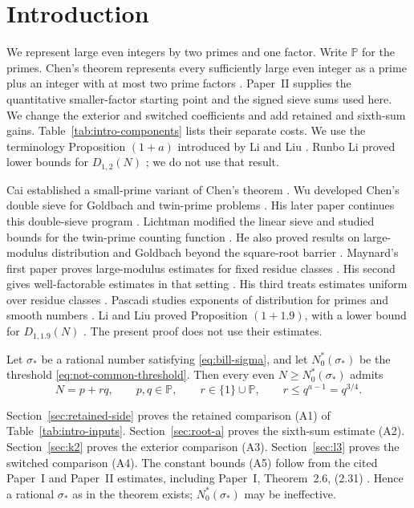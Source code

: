 \section{Introduction}\label{sec:introduction}

We represent large even integers by two primes and one factor.
Write $\mathbb P$ for the primes.
Chen's theorem represents every sufficiently large even integer as a prime
plus an integer with at most two prime factors
\cite{Chen2002}. Paper~II supplies the quantitative smaller-factor starting
point and the signed sieve sums used here. We change the exterior and
switched coefficients and add retained and sixth-sum gains.
Table~\ref{tab:intro-components} lists their separate costs.
We use the terminology Proposition $(1+a)$ introduced by Li and Liu
\cite[p.~2, (1.6)]{LiLiu2026}.
Runbo Li proved lower bounds for $D_{1,2}(N)$
\cite{RunboLi2024}; we do not use that result.

Cai established a small-prime variant of Chen's theorem \cite{Cai2002}.
Wu developed Chen's double sieve for Goldbach and twin-prime problems
\cite{Wu2004}. His later paper continues this double-sieve program
\cite{Wu2008}. Lichtman modified the linear sieve and studied bounds for the
twin-prime counting function \cite{Lichtman21}. He also proved results on
large-modulus distribution and Goldbach beyond the square-root barrier
\cite{Lichtman23}. Maynard's first paper proves large-modulus estimates for
fixed residue classes \cite{MaynardI}. His second gives well-factorable
estimates in that setting \cite{MaynardII}. His third treats estimates
uniform over residue classes \cite{MaynardIII}. Pascadi studies exponents of
distribution for primes and smooth numbers \cite{Pascadi25}. Li and Liu
proved Proposition $(1+1.9)$, with a lower bound for $D_{1,1.9}(N)$
\cite[Theorem~1.1]{LiLiu2026}. The present proof does not use their
estimates.

\begin{theorem}\label{thm:main}
Let $\sigma_*$ be a rational number
satisfying \eqref{eq:bill-sigma}, and let $N_0^*(\sigma_*)$ be the
threshold \eqref{eq:not-common-threshold}. Then every even
$N\ge N_0^*(\sigma_*)$ admits
\begin{equation}\label{eq:intro-target}
 N=p+rq,\qquad p,q\in\mathbb P,\qquad
 r\in\{1\}\cup\mathbb P,\qquad r\le q^{a-1}=q^{3/4}.
\end{equation}
\end{theorem}
Section~\ref{sec:retained-side} proves the retained comparison \textup{(A1)}
of Table~\ref{tab:intro-inputs}.
Section~\ref{sec:root-a} proves the sixth-sum estimate \textup{(A2)}.
Section~\ref{sec:k2} proves the exterior comparison \textup{(A3)}.
Section~\ref{sec:l3} proves the switched comparison \textup{(A4)}. The constant bounds \textup{(A5)} follow from the
cited Paper~I and Paper~II estimates, including Paper~I,
Theorem~2.6, (2.31) \cite[Theorem~2.6, (2.31)]{PaperI}.
Hence a rational $\sigma_*$ as in the theorem exists;
$N_0^*(\sigma_*)$ may be ineffective.

